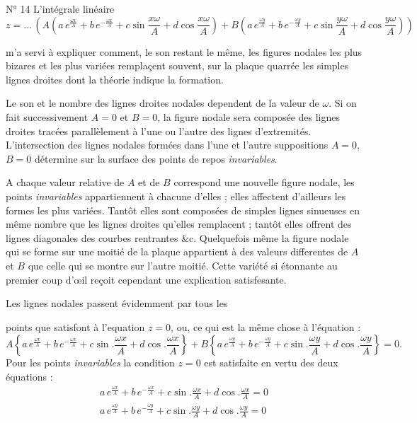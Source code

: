 \documentclass[11pt,a4paper]{article}
\begin{document}
N° 14 L'intégrale linéaire
\[
  z = \ldots\, \left(
   A\left( a\, e^{\frac{\omega x}{A}} + b\, e^{-\frac{\omega x}{A}}
     + c \sin\frac{x\omega}{A} + d \cos\frac{x\omega}{A} \right)
   + B\left( a\, e^{\frac{\omega y}{A}} + b\, e^{-\frac{\omega y}{A}}
     + c \sin\frac{y\omega}{A} + d \cos\frac{y\omega}{A} \right) \right)
\]

m'a servi à expliquer comment, le son restant le même, les figures nodales les
plus bizares et les plus variées remplaçent souvent, sur la plaque quarrée les
simples lignes droites dont la théorie indique la formation.

Le son et le nombre des lignes droites nodales dependent de la valeur de
$\omega$. Si on fait successivement $A = 0$ et $B = 0$, la figure nodale sera
composée des lignes droites tracées parallèlement à l'une ou l'autre des
lignes d'extremités. L'intersection des lignes nodales formées dans l'une et
l'autre suppositions $A = 0$, $B = 0$ détermine sur la surface des points de
repos \emph{invariables}.

A chaque valeur relative de $A$ et de $B$ correspond une nouvelle figure
nodale, les points \emph{invariables} appartiennent à chacune d'elles ; elles
affectent d'ailleurs les formes les plus variées. Tantôt elles sont composées
de simples lignes sinueuses en même nombre que les lignes droites qu'elles
remplacent ; tantôt elles offrent des lignes diagonales des courbes rentrantes
\&c. Quelquefois même la figure nodale qui se forme sur une moitié de la
plaque appartient à des valeurs differentes de $A$ et $B$ que celle qui se
montre sur l'autre moitié. Cette variété si étonnante au premier coup d'œil
reçoit cependant une explication satisfesante.

Les lignes nodales passent évidemment par tous les

points que satisfont à l'equation $z = 0$, ou, ce qui est la même chose à
l'équation :
\[
  A\left\{ a\, e^{\frac{\omega x}{A}} + b\, e^{-\frac{\omega x}{A}}
    + c \sin . \frac{\omega x}{A} + d \cos . \frac{\omega x}{A} \right\}
  + B\left\{ a\, e^{\frac{\omega y}{A}} + b\, e^{-\frac{\omega y}{A}}
    + c \sin . \frac{\omega y}{A} + d \cos . \frac{\omega y}{A} \right\} = 0 .
\]
Pour les points \emph{invariables} la condition $z = 0$ est satisfaite en
vertu des deux équations :
\begin{gather*}
  a\, e^{\frac{\omega x}{A}} + b\, e^{-\frac{\omega x}{A}}
   + c \sin . \frac{\omega x}{A} + d \cos . \frac{\omega x}{A} = 0 \\
  a\, e^{\frac{\omega y}{A}} + b\, e^{-\frac{\omega y}{A}}
   + c \sin . \frac{\omega y}{A} + d \cos . \frac{\omega y}{A} = 0
\end{gather*}
\end{document}
